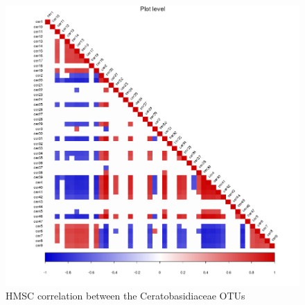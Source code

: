 \begin{figure}[htbp]
\centering
\includegraphics[keepaspectratio,width=\textwidth,height=0.75\textheight]{images/corrCer.png}
\caption{HMSC correlation between the Ceratobasidiaceae OTUs}
\end{figure}

